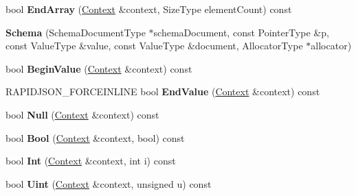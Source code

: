 \begin{DoxyCompactItemize}
\item 
bool {\bfseries End\+Array} (\hyperlink{structinternal_1_1_schema_validation_context}{Context} \&context, Size\+Type element\+Count) const \hypertarget{classinternal_1_1_schema_a58101f966bd7e51086d456b3d84653eb}{}\label{classinternal_1_1_schema_a58101f966bd7e51086d456b3d84653eb}

\item 
{\bfseries Schema} (Schema\+Document\+Type $\ast$schema\+Document, const Pointer\+Type \&p, const Value\+Type \&value, const Value\+Type \&document, Allocator\+Type $\ast$allocator)\hypertarget{classinternal_1_1_schema_a31cbb5eaff43df83253f57d51585dc1d}{}\label{classinternal_1_1_schema_a31cbb5eaff43df83253f57d51585dc1d}

\item 
bool {\bfseries Begin\+Value} (\hyperlink{structinternal_1_1_schema_validation_context}{Context} \&context) const \hypertarget{classinternal_1_1_schema_a60be92e1be5daec58dca25732617ad1b}{}\label{classinternal_1_1_schema_a60be92e1be5daec58dca25732617ad1b}

\item 
R\+A\+P\+I\+D\+J\+S\+O\+N\+\_\+\+F\+O\+R\+C\+E\+I\+N\+L\+I\+NE bool {\bfseries End\+Value} (\hyperlink{structinternal_1_1_schema_validation_context}{Context} \&context) const \hypertarget{classinternal_1_1_schema_a5ea07987ee41ba93eeeb6ff8fc1ea197}{}\label{classinternal_1_1_schema_a5ea07987ee41ba93eeeb6ff8fc1ea197}

\item 
bool {\bfseries Null} (\hyperlink{structinternal_1_1_schema_validation_context}{Context} \&context) const \hypertarget{classinternal_1_1_schema_acf2fd31da6d4ce46142dac016af1c047}{}\label{classinternal_1_1_schema_acf2fd31da6d4ce46142dac016af1c047}

\item 
bool {\bfseries Bool} (\hyperlink{structinternal_1_1_schema_validation_context}{Context} \&context, bool) const \hypertarget{classinternal_1_1_schema_af9b64174e5248f276864ae63ec478ebd}{}\label{classinternal_1_1_schema_af9b64174e5248f276864ae63ec478ebd}

\item 
bool {\bfseries Int} (\hyperlink{structinternal_1_1_schema_validation_context}{Context} \&context, int i) const \hypertarget{classinternal_1_1_schema_a39286fc0bfdfe3be57b1cd61fe162f19}{}\label{classinternal_1_1_schema_a39286fc0bfdfe3be57b1cd61fe162f19}

\item 
bool {\bfseries Uint} (\hyperlink{structinternal_1_1_schema_validation_context}{Context} \&context, unsigned u) const \hypertarget{classinternal_1_1_schema_af355dc00a672448f42caee5a3b62a273}{}\label{classinternal_1_1_schema_af355dc00a672448f42caee5a3b62a273}


\end{DoxyCompactItemize}
